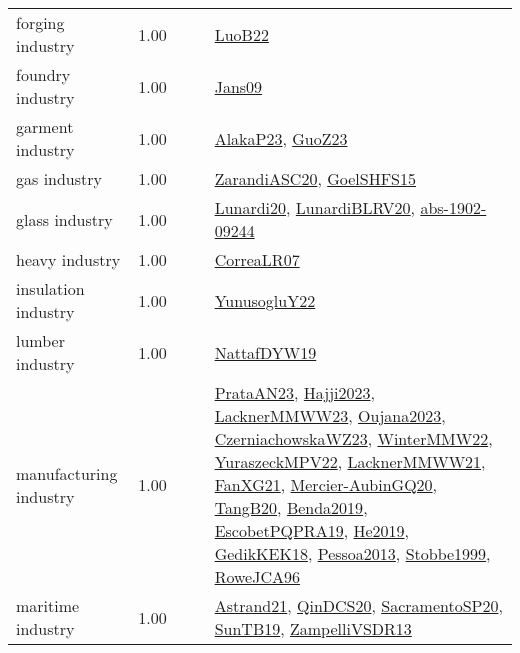{\begin{longtable}{p{3cm}r>{\raggedright\arraybackslash}p{6cm}>{\raggedright\arraybackslash}p{6cm}>{\raggedright\arraybackslash}p{8cm}}
\index{forging industry}\index{Industries!forging industry}forging industry &  1.00 &  &  & \hyperref[detail:LuoB22]{LuoB22}\\
\index{foundry industry}\index{Industries!foundry industry}foundry industry &  1.00 &  &  & \hyperref[detail:Jans09]{Jans09}\\
\index{garment industry}\index{Industries!garment industry}garment industry &  1.00 &  &  & \hyperref[detail:AlakaP23]{AlakaP23}, \hyperref[detail:GuoZ23]{GuoZ23}\\
\index{gas industry}\index{Industries!gas industry}gas industry &  1.00 &  &  & \hyperref[detail:ZarandiASC20]{ZarandiASC20}, \hyperref[detail:GoelSHFS15]{GoelSHFS15}\\
\index{glass industry}\index{Industries!glass industry}glass industry &  1.00 &  &  & \hyperref[detail:Lunardi20]{Lunardi20}, \hyperref[detail:LunardiBLRV20]{LunardiBLRV20}, \hyperref[detail:abs-1902-09244]{abs-1902-09244}\\
\index{heavy industry}\index{Industries!heavy industry}heavy industry &  1.00 &  &  & \hyperref[detail:CorreaLR07]{CorreaLR07}\\
\index{insulation industry}\index{Industries!insulation industry}insulation industry &  1.00 &  &  & \hyperref[detail:YunusogluY22]{YunusogluY22}\\
\index{lumber industry}\index{Industries!lumber industry}lumber industry &  1.00 &  &  & \hyperref[detail:NattafDYW19]{NattafDYW19}\\
\index{manufacturing industry}\index{Industries!manufacturing industry}manufacturing industry &  1.00 &  &  & \hyperref[detail:PrataAN23]{PrataAN23}, \hyperref[detail:Hajji2023]{Hajji2023}, \hyperref[detail:LacknerMMWW23]{LacknerMMWW23}, \hyperref[detail:Oujana2023]{Oujana2023}, \hyperref[detail:CzerniachowskaWZ23]{CzerniachowskaWZ23}, \hyperref[detail:WinterMMW22]{WinterMMW22}, \hyperref[detail:YuraszeckMPV22]{YuraszeckMPV22}, \hyperref[detail:LacknerMMWW21]{LacknerMMWW21}, \hyperref[detail:FanXG21]{FanXG21}, \hyperref[detail:Mercier-AubinGQ20]{Mercier-AubinGQ20}, \hyperref[detail:TangB20]{TangB20}, \hyperref[detail:Benda2019]{Benda2019}, \hyperref[detail:EscobetPQPRA19]{EscobetPQPRA19}, \hyperref[detail:He2019]{He2019}, \hyperref[detail:GedikKEK18]{GedikKEK18}, \hyperref[detail:Pessoa2013]{Pessoa2013}, \hyperref[detail:Stobbe1999]{Stobbe1999}, \hyperref[detail:RoweJCA96]{RoweJCA96}\\
\index{maritime industry}\index{Industries!maritime industry}maritime industry &  1.00 &  &  & \hyperref[detail:Astrand21]{Astrand21}, \hyperref[detail:QinDCS20]{QinDCS20}, \hyperref[detail:SacramentoSP20]{SacramentoSP20}, \hyperref[detail:SunTB19]{SunTB19}, \hyperref[detail:ZampelliVSDR13]{ZampelliVSDR13}\\

\end{longtable}}
